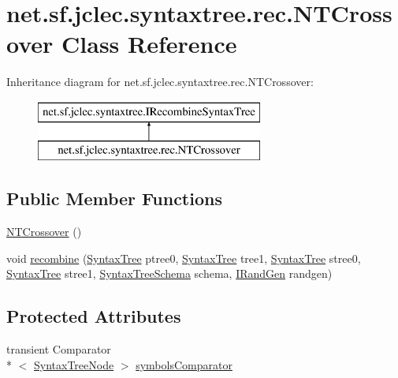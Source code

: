 \hypertarget{classnet_1_1sf_1_1jclec_1_1syntaxtree_1_1rec_1_1_n_t_crossover}{\section{net.\-sf.\-jclec.\-syntaxtree.\-rec.\-N\-T\-Crossover Class Reference}
\label{classnet_1_1sf_1_1jclec_1_1syntaxtree_1_1rec_1_1_n_t_crossover}
}
Inheritance diagram for net.\-sf.\-jclec.\-syntaxtree.\-rec.\-N\-T\-Crossover\-:\begin{figure}[H]
\begin{center}
\leavevmode
\includegraphics[height=2.000000cm]{classnet_1_1sf_1_1jclec_1_1syntaxtree_1_1rec_1_1_n_t_crossover}
\end{center}
\end{figure}
\subsection*{Public Member Functions}
\begin{DoxyCompactItemize}
\item 
\hyperlink{classnet_1_1sf_1_1jclec_1_1syntaxtree_1_1rec_1_1_n_t_crossover_a0f6871f599ab607af9b974f9ad3c12e8}{N\-T\-Crossover} ()
\item 
void \hyperlink{classnet_1_1sf_1_1jclec_1_1syntaxtree_1_1rec_1_1_n_t_crossover_ad0cd4154c78c866da2963ab4513223c8}{recombine} (\hyperlink{classnet_1_1sf_1_1jclec_1_1syntaxtree_1_1_syntax_tree}{Syntax\-Tree} ptree0, \hyperlink{classnet_1_1sf_1_1jclec_1_1syntaxtree_1_1_syntax_tree}{Syntax\-Tree} tree1, \hyperlink{classnet_1_1sf_1_1jclec_1_1syntaxtree_1_1_syntax_tree}{Syntax\-Tree} stree0, \hyperlink{classnet_1_1sf_1_1jclec_1_1syntaxtree_1_1_syntax_tree}{Syntax\-Tree} stree1, \hyperlink{classnet_1_1sf_1_1jclec_1_1syntaxtree_1_1_syntax_tree_schema}{Syntax\-Tree\-Schema} schema, \hyperlink{interfacenet_1_1sf_1_1jclec_1_1util_1_1random_1_1_i_rand_gen}{I\-Rand\-Gen} randgen)
\end{DoxyCompactItemize}
\subsection*{Protected Attributes}
\begin{DoxyCompactItemize}
\item 
transient Comparator\\*
$<$ \hyperlink{classnet_1_1sf_1_1jclec_1_1syntaxtree_1_1_syntax_tree_node}{Syntax\-Tree\-Node} $>$ \hyperlink{classnet_1_1sf_1_1jclec_1_1syntaxtree_1_1rec_1_1_n_t_crossover_accc315cabf9de4cc9ac2dd4d50725187}{symbols\-Comparator}
\end{DoxyCompactItemize}


